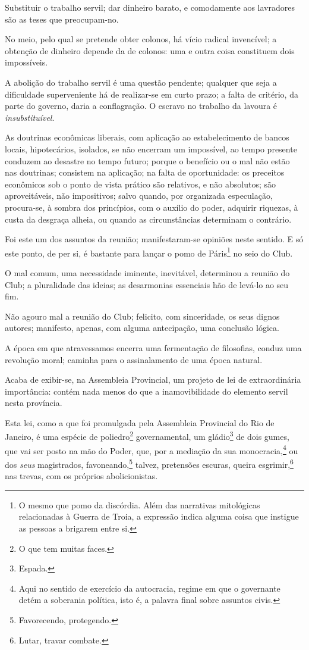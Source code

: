 {Substituir o trabalho servil; dar dinheiro barato, e comodamente aos
lavradores são as teses que preocupam-no.

No meio, pelo qual se pretende obter colonos, há vício radical
invencível; a obtenção de dinheiro depende da de colonos: uma e outra
coisa constituem dois impossíveis.

A abolição do trabalho servil é uma questão pendente; qualquer que seja
a dificuldade superveniente há de realizar-se em curto prazo; a falta de
critério, da parte do governo, daria a conflagração. O escravo no
trabalho da lavoura é \emph{insubstituível}.

As doutrinas econômicas liberais, com aplicação ao estabelecimento de
bancos locais, hipotecários, isolados, se não encerram um impossível, ao
tempo presente conduzem ao desastre no tempo futuro; porque o benefício
ou o mal não estão nas doutrinas; consistem na aplicação; na falta de
oportunidade: os preceitos econômicos sob o ponto de vista prático são
relativos, e não absolutos; são aproveitáveis, não impositivos; salvo
quando, por organizada especulação, procura-se, à sombra dos princípios,
com o auxílio do poder, adquirir riquezas, à custa da desgraça alheia,
ou quando as circunstâncias determinam o contrário.

Foi este um dos assuntos da reunião; manifestaram-se opiniões neste
sentido. E só este ponto, de per si, é bastante para lançar o pomo de
Páris\footnote{O mesmo que pomo da discórdia. Além das narrativas
  mitológicas relacionadas à Guerra de Troia, a expressão indica alguma
  coisa que instigue as pessoas a brigarem entre si.} no seio do Club.

O mal comum, uma necessidade iminente, inevitável, determinou a reunião
do Club; a pluralidade das ideias; as desarmonias essenciais hão de
levá-lo ao seu fim.

Não agouro mal a reunião do Club; felicito, com sinceridade, os seus
dignos autores; manifesto, apenas, com alguma antecipação, uma conclusão
lógica.

A época em que atravessamos encerra uma fermentação de filosofias,
conduz uma revolução moral; caminha para o assinalamento de uma época
natural.

\asterisc

Acaba de exibir-se, na Assembleia Provincial, um projeto de lei de
extraordinária importância: contém nada menos do que a inamovibilidade
do elemento servil nesta província.

Esta lei, como a que foi promulgada pela Assembleia Provincial do Rio de
Janeiro, é uma espécie de poliedro\footnote{O que tem muitas faces.}
governamental, um gládio\footnote{Espada.} de dois gumes, que vai ser
posto na mão do Poder, que, por a mediação da sua monocracia,\footnote{
  Aqui no sentido de exercício da autocracia, regime em que o governante
  detém a soberania política, isto é, a palavra final sobre assuntos
  civis.} ou dos \emph{seus} magistrados, favoneando,\footnote{
  Favorecendo, protegendo.} talvez, pretensões escuras, queira
esgrimir,\footnote{Lutar, travar combate.} nas trevas, com os próprios
abolicionistas.

}
